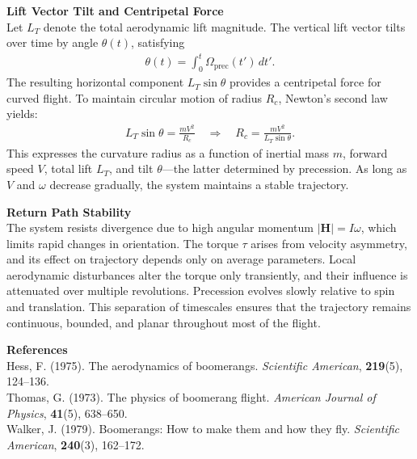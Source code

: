 \begin{technical}
\textbf{Lift Vector Tilt and Centripetal Force}\\[0.5em]
Let $L_T$ denote the total aerodynamic lift magnitude. The vertical lift vector tilts over time by angle $\theta(t)$, satisfying
\begin{align}
\theta(t) = \int_0^t \Omega_\text{prec}(t')\,dt'.
\end{align}
The resulting horizontal component $L_T \sin\theta$ provides a centripetal force for curved flight. To maintain circular motion of radius $R_c$, Newton’s second law yields:
\begin{align}
L_T \sin\theta = \frac{m V^2}{R_c} \quad \Rightarrow \quad R_c = \frac{m V^2}{L_T \sin\theta}.
\end{align}
This expresses the curvature radius as a function of inertial mass $m$, forward speed $V$, total lift $L_T$, and tilt $\theta$—the latter determined by precession. As long as $V$ and $\omega$ decrease gradually, the system maintains a stable trajectory.

\textbf{Return Path Stability}\\[0.5em]
The system resists divergence due to high angular momentum $|\mathbf{H}| = I \omega$, which limits rapid changes in orientation. The torque $\tau$ arises from velocity asymmetry, and its effect on trajectory depends only on average parameters. Local aerodynamic disturbances alter the torque only transiently, and their influence is attenuated over multiple revolutions. Precession evolves slowly relative to spin and translation. This separation of timescales ensures that the trajectory remains continuous, bounded, and planar throughout most of the flight.

\textbf{References}\\
Hess, F. (1975). The aerodynamics of boomerangs. \textit{Scientific American}, \textbf{219}(5), 124–136.\\
Thomas, G. (1973). The physics of boomerang flight. \textit{American Journal of Physics}, \textbf{41}(5), 638–650.\\
Walker, J. (1979). Boomerangs: How to make them and how they fly. \textit{Scientific American}, \textbf{240}(3), 162–172.

\end{technical}
